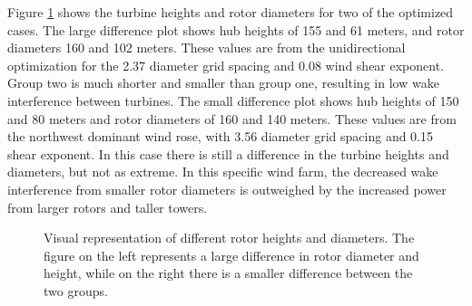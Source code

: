 \documentclass[conf]{new-aiaa}
\begin{document}
Figure \ref{turbines} shows the turbine heights and rotor diameters for two of the optimized cases. The large difference plot shows hub heights of 155 and 61 meters, and rotor diameters 160 and 102 meters. These values are from the unidirectional optimization for the 2.37 diameter grid spacing and 0.08 wind shear exponent. Group two is much shorter and smaller than group one, resulting in low wake interference between turbines. The small difference plot shows hub heights of 150 and 80 meters and rotor diameters of 160 and 140 meters. These values are from  the northwest dominant wind rose, with 3.56 diameter grid spacing and 0.15 shear exponent. In this case there is still a difference in the turbine heights and diameters, but not as extreme. In this specific wind farm, the decreased wake interference from smaller rotor diameters is outweighed by the increased power from larger rotors and taller towers.

\begin{figure}[htbp]
\begin{centering}
    \caption{Visual representation of different rotor heights and diameters. The figure on the left represents a large difference in rotor diameter and height, while on the right there is a smaller difference between the two groups.}
  \label{turbines}
  \end{centering}
\end{figure}
\end{document}
